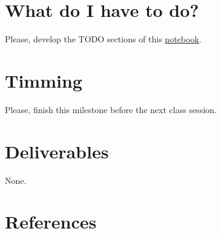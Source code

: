 \section{What do I have to do?}

\begin{comment}
Please, using
\href{https://github.com/Sistemas-Multimedia/Sistemas-Multimedia.github.io/blob/master/milestones/08-DWT/DWT_filters_analysis.ipynb}{this
  notebook}, determine the frequency and phase responses of the
\href{http://wavelets.pybytes.com/wavelet/db20/}{Daubechies 20} and
\href{http://wavelets.pybytes.com/wavelet/bior6.8/}{Biorthogonal-6.8}
filters. Determine also their relative gains, using the energy of the
signal resulting of applying the synthesis transform to the impulse
signal. 
\end{comment}

Please, develop the TODO sections of this
\href{https://github.com/Sistemas-Multimedia/Sistemas-Multimedia.github.io/blob/master/milestones/08-DWT/DWT_compression.ipynb}{notebook}.

\section{Timming}

Please, finish this milestone before the next class session.

\section{Deliverables}

None.

\section{References}

\renewcommand{\addcontentsline}[3]{}%

